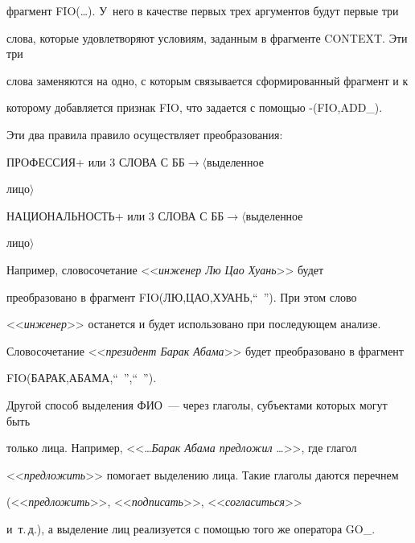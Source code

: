 фрагмент {\sf FIO(\ldots)}. У~него в качестве первых трех аргументов будут первые три 


слова, которые удовлетворяют условиям, заданным в фрагменте {\sf CONTEXT}. Эти три 


слова заменяются на одно, с которым связывается сформированный фрагмент и к 


которому добавляется признак {\sf FIO}, что задается с помощью  {-(FIO,ADD\_)}.





Эти два правила  правило осуществляет преобразования: 





{\sf ПРОФЕССИЯ\;+ или 3 СЛОВА С ББ\;$\rightarrow$\;$\langle$выделенное 


лицо$\rangle$


 


НАЦИОНАЛЬНОСТЬ\;+ или 3 СЛОВА С ББ\;$\rightarrow$\;$\langle$выделенное 


лицо$\rangle$}





    Например, словосочетание <<\textit{инженер Лю Цао Хуань}>> будет 


преобразовано в фрагмент {\sf FIO(ЛЮ,ЦАО,ХУАНЬ,``~''}). При этом слово 


<<\textit{инженер}>> останется и будет использовано при последующем анализе. 


Словосочетание <<\textit{президент Барак Абама}>> будет преобразовано в фрагмент 


{\sf FIO(БАРАК,АБАМА,``~'',``~'')}.


   


   Другой способ выделения ФИО~--- через глаголы, субъектами которых могут быть 


только лица. Например, <<\ldots \textit{Барак Абама  предложил} \ldots>>, где глагол 


<<\textit{предложить}>> помогает выделению лица. Такие глаголы даются перечнем 


(<<\textit{предложить}>>, <<\textit{подписать}>>, <<\textit{согласиться}>> 


и~т.\,д.), а выделение лиц реализуется с помощью того же оператора {\sf GO\_}.    


   


